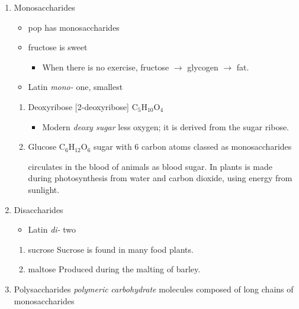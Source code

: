\documentclass[11pt]{article}
\begin{document}
\begin{enumerate}
\item Monosaccharides
\label{sec:org9883b36}
\begin{itemize}
\item pop has monosaccharides
\item fructose is sweet
\begin{itemize}
\item When there is no exercise, fructose \(\rightarrow\) glycogen \(\rightarrow\) fat.
\end{itemize}

\item Latin \emph{mono-} one, smallest
\end{itemize}

\begin{enumerate}
\item Deoxyribose [2-deoxyribose] C\(_{\text{5}}\)H\(_{\text{10}}\)O\(_{\text{4}}\)
\label{sec:orgcb10a54}
\begin{itemize}
\item Modern \emph{deoxy sugar} less oxygen; it is derived from the sugar ribose.
\end{itemize}

\item Glucose C\(_{\text{6}}\)H\(_{\text{12}}\)O\(_{\text{6}}\)
\label{sec:orgd62c86c}
sugar with 6 carbon atoms classed as monosaccharides

circulates in the blood of animals as blood sugar. In plants is made
during photosynthesis from water and carbon dioxide, using energy from
sunlight.
\end{enumerate}

\item Disaccharides
\label{sec:org5773569}
\begin{itemize}
\item Latin \emph{di-} two
\end{itemize}

\begin{enumerate}
\item sucrose
\label{sec:orgca32215}
Sucrose is found in many food plants.

\item maltose
\label{sec:org253185b}
Produced during the malting of barley.
\end{enumerate}

\item Polysaccharides
\label{sec:org605872d}
\emph{polymeric} \emph{carbohydrate} molecules composed of long chains of monosaccharides


\end{enumerate}
\end{document}
